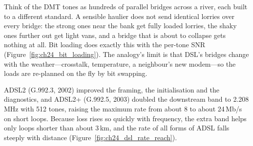 \begin{analogy}
Think of the DMT tones as hundreds of parallel bridges across a river, each built to a different
standard. A sensible haulier does not send identical lorries over every bridge: the strong ones
near the bank get fully loaded lorries, the shaky ones further out get light vans, and a bridge
that is about to collapse gets nothing at all. Bit loading does exactly this with the per-tone SNR
(Figure~\ref{fig:ch24_bit_loading}). The analogy's limit is that DSL's bridges change with the
weather---crosstalk, temperature, a neighbour's new modem---so the loads are re-planned on the fly
by bit swapping.
\end{analogy}


ADSL2 (G.992.3, 2002) improved the framing, the initialisation and the diagnostics, and ADSL2+
(G.992.5, 2003) doubled the downstream band to 2.208\,MHz with 512 tones, raising the maximum rate
from about 8 to about 24\,Mb/s on short loops. Because loss rises so quickly with frequency, the
extra band helps only loops shorter than about 3\,km, and the rate of all forms of ADSL falls
steeply with distance (Figure~\ref{fig:ch24_dsl_rate_reach}).

